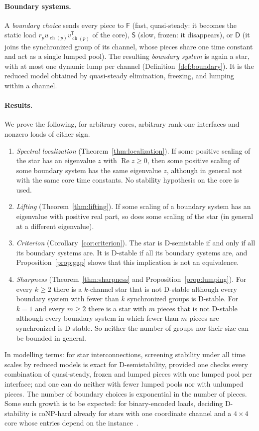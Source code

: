 \documentclass[11pt,a4paper]{article}
\theoremstyle{plain}
\theoremstyle{definition}
\theoremstyle{remark}
\newcommand{\Real}{\operatorname{Re}}
\newcommand{\ch}{\operatorname{ch}}
\newcommand{\rF}{\mathsf{F}}
\newcommand{\rS}{\mathsf{S}}
\newcommand{\rD}{\mathsf{D}}
\newcommand{\T}{\mathsf{T}}
\begin{document}
\paragraph{Boundary systems.} A \emph{boundary choice} sends every piece to $\rF$ (fast,
quasi-steady: it becomes the static load $r_pu_{\ch(p)}v_{\ch(p)}^\T$ of the core),
$\rS$ (slow, frozen: it disappears), or $\rD$ (it joins the synchronized group of its
channel, whose pieces share one time constant and act as a single lumped pool). The
resulting \emph{boundary system} is again a star, with at most one dynamic lump per
channel (Definition~\ref{def:boundary}). It is the reduced model obtained by quasi-steady
elimination, freezing, and lumping within a channel.

\paragraph{Results.} We prove the following, for arbitrary cores, arbitrary rank-one
interfaces and nonzero loads of either sign.
\begin{enumerate}[label=(\Alph*)]
  \item \emph{Spectral localization} (Theorem~\ref{thm:localization}). If some positive
    scaling of the star has an eigenvalue $z$ with $\Real z\ge0$, then some positive
    scaling of some boundary system has the same eigenvalue $z$, although in general not
    with the same core time constants. No stability hypothesis on the core is used.
  \item \emph{Lifting} (Theorem~\ref{thm:lifting}). If some scaling of a boundary system
    has an eigenvalue with positive real part, so does some scaling of the star (in
    general at a different eigenvalue).
  \item \emph{Criterion} (Corollary~\ref{cor:criterion}). The star is D-semistable if and
    only if all its boundary systems are. It is D-stable if all its boundary systems are,
    and Proposition~\ref{prop:gap} shows that this implication is not an equivalence.
  \item \emph{Sharpness} (Theorem~\ref{thm:sharpness} and Proposition~\ref{prop:lumping}).
    For every $k\ge2$ there is a $k$-channel star that is not D-stable although every
    boundary system with fewer than $k$ synchronized groups is D-stable. For $k=1$ and every
    $m\ge2$ there is a star with $m$ pieces that is not D-stable although every boundary
    system in which fewer than $m$ pieces are synchronized is D-stable. So neither the number
    of groups nor their size can be bounded in general.
\end{enumerate}
In modelling terms: for star interconnections, screening stability under all time scales
by reduced models is exact for D-semistability, provided one checks every combination of
quasi-steady, frozen and lumped pieces with one lumped pool per interface; and one can do
neither with fewer lumped pools nor with unlumped pieces. The number of boundary choices is
exponential in the number of pieces. Some such growth is to be expected: for binary-encoded
loads, deciding D-stability is coNP-hard already for stars with one coordinate channel and a
$4\times4$ core whose entries depend on the instance~\cite{companionHard2026}.
\end{document}

